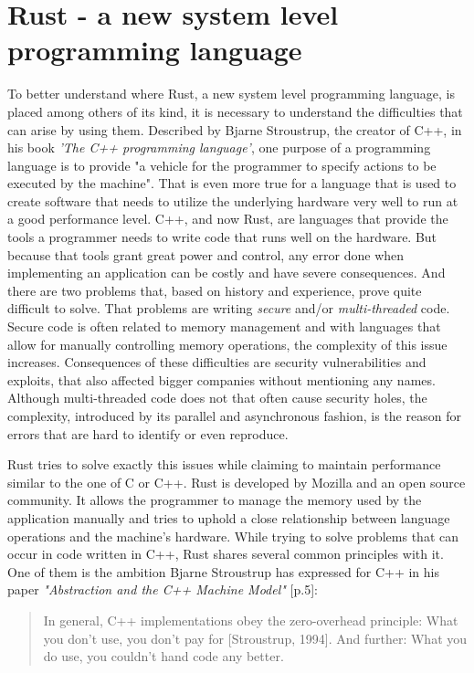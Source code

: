 \chapter{Rust - a new system level programming language}

To better understand where Rust, a new system level programming language, is placed among others of its kind, it is necessary to understand the difficulties that can arise by using them. Described by Bjarne Stroustrup, the creator of C++, in his book \textit{'The C++ programming language'}, one purpose of a programming language is to provide "a vehicle for the programmer to specify actions to be executed by the machine". That is even more true for a language that is used to create software that needs to utilize the underlying hardware very well to run at a good performance level. C++, and now Rust, are languages that provide the tools a programmer needs to write code that runs well on the hardware. But because that tools grant great power and control, any error done when implementing an application can be costly and have severe consequences. And there are two problems that, based on history and experience, prove quite difficult to solve. That problems are writing \textit{secure} and/or \textit{multi-threaded} code.
Secure code is often related to memory management and with languages that allow for manually controlling memory operations, the complexity of this issue increases. Consequences of these difficulties are security vulnerabilities and exploits, that also affected bigger companies without mentioning any names.
Although multi-threaded code does not that often cause security holes, the complexity, introduced by its parallel and asynchronous fashion, is the reason for errors that are hard to identify or even reproduce.

Rust tries to solve exactly this issues while claiming to maintain performance similar to the one of C or C++. Rust is developed by Mozilla and an open source community. It allows the programmer to manage the memory used by the application manually and tries to uphold a close relationship between language operations and the machine's hardware. While trying to solve problems that can occur in code written in C++, Rust shares several common principles with it. One of them is the ambition Bjarne Stroustrup has expressed for C++ in his paper \textit{"Abstraction and the C++ Machine Model"} \cite{Stroustrup2005}[p.5]:

\begin{quote}
	In general, C++ implementations obey the zero-overhead principle: What you don’t use, you don’t pay for [Stroustrup, 1994]. And further: What you do use, you couldn’t hand code any better.
\end{quote}

